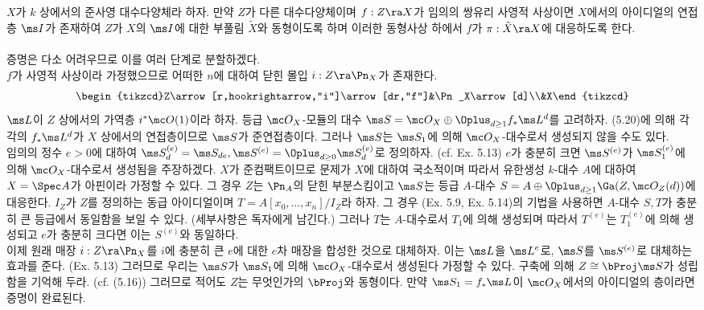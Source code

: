 	
	\begin{theorem}
	$X$가 $k$ 상에서의 준사영 대수다양체라 하자. 만약 $Z$가 다른 대수다양체이며 $f:Z\ra X$가 임의의 쌍유리 사영적 사상이면
	$X$에서의 아이디얼의 연접층 $\ms I$가 존재하여 $Z$가 $X$의 $\ms I$에 대한 부풀림 $\tilde X$와 동형이도록 하며
	이러한 동형사상 하에서 $f$가 $\pi:\tilde X\ra X$에 대응하도록 한다.\\\\
	\pf 증명은 다소 어려우므로 이를 여러 단계로 분할하겠다.\\
	 $f$가 사영적 사상이라 가정했으므로 어떠한 $n$에 대하여 닫힌 몰입 $i:Z\ra\Pn_X$가 존재한다.
	$$\begin{tikzcd}Z\arrow[r,hookrightarrow,"i"]\arrow[dr,"f"]&\Pn_X\arrow[d]\\&X\end{tikzcd}$$
	$\ms L$이 $Z$ 상에서의 가역층 $i^*\mc O(1)$이라 하자.
	등급 $\mc O_X$-모듈의 대수 $\ms S=\mc O_X\oplus\Oplus_{d\ge 1}f_*\ms L^d$를 고려하자.
	(5.20)에 의해 각각의 $f_*\ms L^d$가 $X$ 상에서의 연접층이므로 $\ms S$가 준연접층이다.
	그러나 $\ms S$는 $\ms S_1$에 의해 $\mc O_X$-대수로서 생성되지 않을 수도 있다.\\
	 임의의 정수 $e>0$에 대하여 $\ms S^{(e)}_d=\ms S_{de},\ms S^{(e)}=\Oplus_{d\ge 0}\ms S^{(e)}_d$로 정의하자.
	(cf. Ex. 5.13) $e$가 충분히 크면 $\ms S^{(e)}$가 $\ms S^{(e)}_1$에 의해 $\mc O_X$-대수로서 생성됨을 주장하겠다.
	$X$가 준컴팩트이므로 문제가 $X$에 대하여 국소적이며 따라서 유한생성 $k$-대수 $A$에 대하여 $X=\Spec A$가 아핀이라 가정할 수 있다.
	그 경우 $Z$는 $\Pn_A$의 닫힌 부분스킴이고 $\ms S$는 등급 $A$-대수 $S=A\oplus\Oplus_{d\ge 1}\Ga(Z,\mc O_Z(d))$에 대응한다.
	$I_Z$가 $Z$를 정의하는 동급 아이디얼이며 $T=A[x_0,\ldots,x_n]/I_Z$라 하자.
	그 경우 (Ex. 5.9, Ex. 5.14)의 기법을 사용하면 $A$-대수 $S,T$가 충분히 큰 등급에서 동일함을 보일 수 있다.
	(세부사항은 독자에게 남긴다.) 그러나 $T$는 $A$-대수로서 $T_1$에 의해 생성되며 따라서 $T^{(e)}$는 $T_1^{(e)}$에 의해 생성되고
	$e$가 충분히 크다면 이는 $S^{(e)}$와 동일하다.\\
	 이제 원래 매장 $i:Z\ra\Pn_X$를 $i$에 충분히 큰 $e$에 대한 $e$차 매장을 합성한 것으로 대체하자.
	이는 $\ms L$을 $\ms L^e$로, $\ms S$를 $\ms S^{(e)}$로 대체하는 효과를 준다. (Ex. 5.13)
	그러므로 우리는 $\ms S$가 $\ms S_1$에 의해 $\mc O_X$-대수로서 생성된다 가정할 수 있다.
	구축에 의해 $Z\cong\bProj\ms S$가 성립함을 기억해 두라. (cf. (5.16)) 그러므로 적어도 $Z$는 무엇인가의 $\bProj$와 동형이다.
	만약 $\ms S_1=f_*\ms L$이 $\mc O_X$에서의 아이디얼의 층이라면 증명이 완료된다.

\end{theorem}
